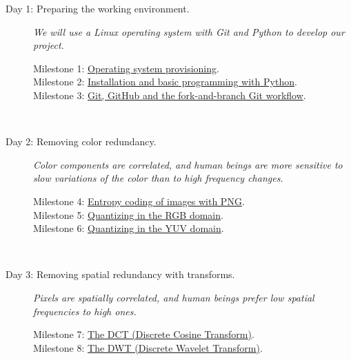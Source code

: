 \begin{description}
\item [Day 1: {\normalfont Preparing the working
    environment.}] \emph{We will use a Linux operating system with
  Git and Python to develop our project.}
  \begin{description}
  \item [Milestone 1: {\normalfont \href{https://sistemas-multimedia.github.io/milestones/01-provisioning/}{Operating system provisioning}.}]
  \item [Milestone 2: {\normalfont \href{https://sistemas-multimedia.github.io/milestones/02-python/}{Installation and basic programming with Python}.}]
  \item [Milestone 3: {\normalfont \href{https://sistemas-multimedia.github.io/milestones/03-git/}{Git, GitHub and the fork-and-branch Git workflow}.}]
  \end{description}
  ~\newline

\item [Day 2: {\normalfont Removing color redundancy.}] \emph{Color
    components are correlated, and human beings are more sensitive to
    slow variations of the color than to high frequency changes.}
  \begin{description}
  \item [Milestone 4: {\normalfont \href{https://sistemas-multimedia.github.io/milestones/04-Motion_PNG/}{Entropy coding of images with PNG}.}]
  \item [Milestone 5: {\normalfont \href{https://sistemas-multimedia.github.io/milestones/05-RGB_quantization/}{Quantizing in the RGB domain}.}]
  \item [Milestone 6: {\normalfont \href{https://sistemas-multimedia.github.io/milestones/06-YUV_quantization/}{Quantizing in the YUV domain}.}] %
  \end{description}
  ~\newline

\item [Day 3: {\normalfont Removing spatial redundancy with transforms.}]
  \emph{Pixels are spatially correlated, and human beings prefer low
    spatial frequencies to high ones.}
  \begin{description}
  \item [Milestone 7: {\normalfont \href{https://sistemas-multimedia.github.io/milestones/07-DWT/}{The DCT (Discrete Cosine Transform)}.}]
  \item [Milestone 8: {\normalfont \href{https://sistemas-multimedia.github.io/milestones/08-DWT/}{The DWT (Discrete Wavelet Transform)}.}]
  \end{description}
  ~\newline


\end{description}
